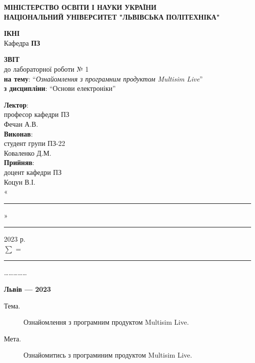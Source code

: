 \documentclass{article}
\newcommand\subject{Основи електроніки}
\newcommand\lecturer{професор кафедри ПЗ \\ Фечан А.В.}
\newcommand\teacher{доцент кафедри ПЗ \\ Коцун В.І.}
\newcommand\mygroup{ПЗ-22}
\newcommand\lab{1}
\newcommand\theme{Ознайомлення з програмним продуктом Multisim Live}
\newcommand\purpose{Ознайомитись з програминим продуктом Multisim Live}
\begin{document}
\begin{normalsize}
	\begin{titlepage}
		\thispagestyle{empty}
		\begin{center}
			\textbf{МІНІСТЕРСТВО ОСВІТИ І НАУКИ УКРАЇНИ\\
				НАЦІОНАЛЬНИЙ УНІВЕРСИТЕТ "ЛЬВІВСЬКА ПОЛІТЕХНІКА"}
		\end{center}
		\begin{flushright}
			\textbf{ІКНІ}\\
			Кафедра \textbf{ПЗ}
		\end{flushright}
		\vspace{200pt}
		\begin{center}
			\textbf{ЗВІТ}\\
			\vspace{10pt}
			до лабораторної роботи № \lab\\
			\textbf{на тему}: “\textit{\theme}”\\
			\textbf{з дисципліни}: “\subject”
		\end{center}
		\vspace{112pt}
		\begin{flushright}
			
			\textbf{Лектор}:\\
			\lecturer\\
			\vspace{28pt}
			\textbf{Виконав}:\\
			
			студент групи \mygroup\\
			Коваленко Д.М.\\
			\vspace{28pt}
			\textbf{Прийняв}:\\
			
			\teacher\\
			
			\vspace{28pt}
			«\rule{1cm}{0.15mm}» \rule{1.5cm}{0.15mm} 2023 р.\\
			$\sum$ = \rule{1cm}{0.15mm}……………\\
			
		\end{flushright}
		\vspace{\fill}
		\begin{center}
			\textbf{Львів — 2023}
		\end{center}
	\end{titlepage}
		
	\begin{description}
		\item[Тема.] \theme.
		\item[Мета.] \purpose.
	\end{description}


\end{normalsize}
\end{document}
